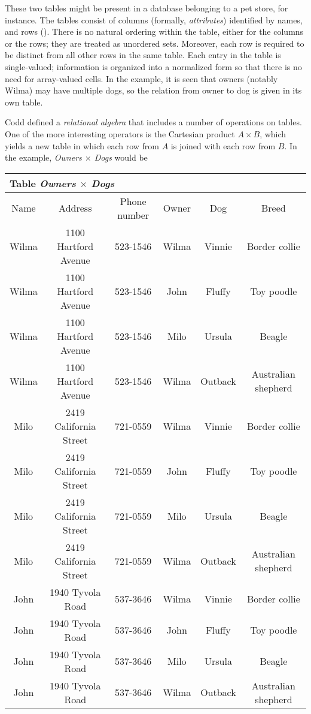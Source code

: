 \documentclass[12pt]{article}
\begin{document}
These two tables might be present in a database belonging to a pet store,
for instance.  The tables consist of columns (formally, {\em attributes})
identified by names, and rows ({\em }).  There is no natural ordering
within the table, either for the columns or the rows; they are treated as 
unordered sets.  Moreover, each row is required to be distinct from all 
other rows in the same table.  Each entry in the table is single-valued;
information is organized into a normalized form so that there is no need for 
array-valued cells.  In the example, it is seen that owners (notably Wilma) may
have multiple dogs, so the relation from owner to dog is given in its own 
table.

Codd defined a {\em relational algebra} that includes a number of operations
on tables.  One of the more interesting operators is the Cartesian product
$A \times B$, which yields a new table in which each row from $A$ is 
joined with each row from $B$.   In the example, 
{\em Owners $\times$ Dogs} would be

\vspace{5mm}
\begin{tabular}{|c|c|c|c|c|c|}
\multicolumn{6}{l}{Table {\em Owners $\times$ Dogs}} \\
\hline
Name & Address & Phone number & Owner & Dog & Breed \\
\hline
Wilma & 1100 Hartford Avenue & 523-1546 & Wilma & Vinnie & Border collie \\
Wilma & 1100 Hartford Avenue & 523-1546 & John & Fluffy & Toy poodle \\
Wilma & 1100 Hartford Avenue & 523-1546 & Milo & Ursula & Beagle \\
Wilma & 1100 Hartford Avenue & 523-1546 & Wilma & Outback & Australian shepherd \\
Milo & 2419 California Street  & 721-0559 & Wilma & Vinnie & Border collie \\
Milo & 2419 California Street  & 721-0559 & John & Fluffy & Toy poodle \\ 
Milo & 2419 California Street  & 721-0559 & Milo & Ursula & Beagle \\
Milo & 2419 California Street  & 721-0559 & Wilma & Outback & Australian shepherd \\
John & 1940 Tyvola Road & 537-3646 & Wilma & Vinnie & Border collie \\
John & 1940 Tyvola Road & 537-3646 & John & Fluffy & Toy poodle \\
John & 1940 Tyvola Road & 537-3646 & Milo & Ursula & Beagle \\
John & 1940 Tyvola Road & 537-3646 & Wilma & Outback & Australian shepherd \\
\hline
\end{tabular}
\vspace{5mm}
\end{document}
